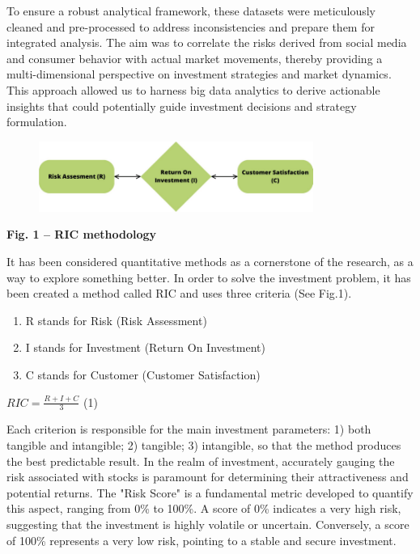 {To ensure a robust analytical framework, these datasets were
meticulously cleaned and pre-processed to address inconsistencies and
prepare them for integrated analysis. The aim was to correlate the risks
derived from social media and consumer behavior with actual market
movements, thereby providing a multi-dimensional perspective on
investment strategies and market dynamics. This approach allowed us to
harness big data analytics to derive actionable insights that could
potentially guide investment decisions and strategy formulation.

\begin{figure}[H]
	\centering
	\includegraphics[width=0.8\textwidth]{media/ict2/image9}
	\caption*{}
\end{figure}


{\bfseries Fig. 1 -- RIC methodology}

It has been considered quantitative methods as a cornerstone of the
research, as a way to explore something better. In order to solve the
investment problem, it has been created a method called RIC and uses
three criteria (See Fig.1).

\begin{enumerate}
\def\labelenumi{\arabic{enumi})}
\item
  R stands for Risk (Risk Assessment)
\item
  I stands for Investment (Return On Investment)
\item
  C stands for Customer (Customer Satisfaction)
\end{enumerate}

\(RIC = \frac{R + I + C}{3}\) (1)

Each criterion is responsible for the main investment parameters: 1)
both tangible and intangible; 2) tangible; 3) intangible, so that the
method produces the best predictable result. In the realm of investment,
accurately gauging the risk associated with stocks is paramount for
determining their attractiveness and potential returns. The "Risk Score"
is a fundamental metric developed to quantify this aspect, ranging from
0\% to 100\%. A score of 0\% indicates a very high risk, suggesting that
the investment is highly volatile or uncertain. Conversely, a score of
100\% represents a very low risk, pointing to a stable and secure
investment.

}
